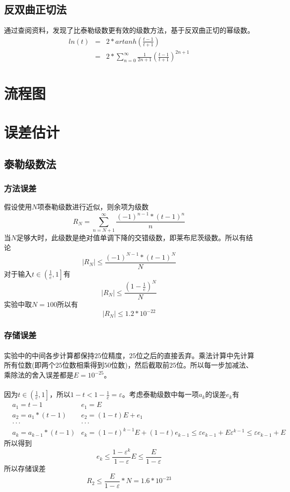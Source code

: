 \documentclass[UTF8,twocolum,titlepage]{ctexart}
\begin{document}
\subsection*{反双曲正切法}
通过查阅资料，发现了比泰勒级数更有效\cite{Logarithm_Wikipedia}的级数方法，基于反双曲正切的幂级数。
\begin{eqnarray*}
ln\left(t\right) &=&2*artanh\left(\frac{t-1}{t+1}\right)\\&=&2*\sum_{n=0}^{\infty}\frac{1}{2n+1}\left(\frac{t-1}{t+1}\right)^{2n+1}
\end{eqnarray*}

\section*{流程图}

\section*{误差估计}
\subsection*{泰勒级数法}
\subsubsection*{方法误差}
假设使用$N$项泰勒级数进行近似，则余项为级数$$R_N=\sum\limits_{n=N+1}^{\infty}\frac{\left(-1\right)^{n-1}*\left(t-1\right)^{n}}{n}$$
当$N$足够大时，此级数是绝对值单调下降的交错级数，即莱布尼茨级数。所以有结论$$\left|R_N\right| \le  \frac{\left(-1\right)^{N-1}*\left(t-1\right)^{N}}{N}$$对于输入$t\in\left(\frac{1}{e},1 \right]$有$$\left|R_N\right| \le \frac{\left(1-\frac{1}{e}\right)^N}{N}$$实验中取$N=100$所以有$$\left|R_N\right| \le 1.2*10^{-22}$$
\subsubsection*{存储误差}
\paragraph{}
实验中的中间各步计算都保持$25$位精度，$25$位之后的直接丢弃。乘法计算中先计算所有位数(即两个$25$位数相乘得到$50$位数)，然后截取前$25$位。所以每一步加减法、乘除法的舍入误差都是$E=10^{-25}$。
\paragraph{}
因为$t\in\left(\frac{1}{e},1\right]$，所以$1-t < 1-\frac{1}{e}=\varepsilon$。考虑泰勒级数中每一项$a_k$的误差$e_k$有
\begin{eqnarray*}
&a_1=t-1 &e_1=E\\
&a_2=a_1*(t-1) &e_2=(1-t)E+e_1\\
&\cdot\cdot\cdot&\cdot\cdot\cdot\\
&a_k=a_{k-1}*(t-1) &e_k=(1-t)^{k-1}E+(1-t)e_{k-1} \le \varepsilon e_{k-1}+E\varepsilon^{k-1} \le \varepsilon e_{k-1}+E
\end{eqnarray*}
所以得到$$e_k \le \frac{1-\varepsilon^k}{1-\varepsilon}E \le \frac{E}{1-\varepsilon}$$所以存储误差$$R_2 \le \frac{E}{1-\varepsilon}*N=1.6*10^{-23}$$
\end{document}
